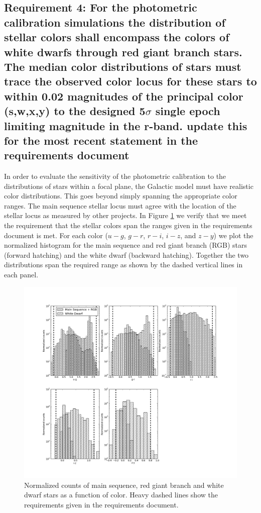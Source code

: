 \documentclass[]{article}
\begin{document}
{\subsection{Requirement 4: For the photometric calibration simulations
the distribution of stellar colors shall encompass the colors of white dwarfs through red giant branch stars.
The median color distributions of stars must trace the observed color locus for these stars to within 0.02 magnitudes
of the principal color (s,w,x,y) to the designed 5$\sigma$ single epoch limiting magnitude in the r-band.
{\bf update this for the most recent statement in the requirements document}}
In order to evaluate the sensitivity of the photometric calibration to the distributions of stars within a focal plane, the Galactic model
must have realistic color distributions.
This goes beyond simply spanning the appropriate color ranges.  The main sequence stellar locus must agree with the location of the
stellar locus as measured by other projects.  In Figure \ref{fig:starcolorspan} we verify that we meet the requirement that the stellar
colors span the ranges given in the requirements document is met.  For each color ($u-g$, $g-r$, $r-i$, $i-z$, and $z-y$) we plot the normalized histogram
for the main sequence and red giant branch (RGB) stars (forward hatching) and the white dwarf (backward hatching).  Together the two distributions span the required
range as shown by the dashed vertical lines in each panel.  
\begin{figure}[H]
\centering
\includegraphics[width=5in]{validation_figures/star_lsst_color_hist.png}
\caption{Normalized counts of main sequence, red giant branch and white dwarf stars as a function of color.  Heavy dashed lines show the requirements given in the requirements document.\label{fig:starcolorspan}}
\end{figure}

}
\end{document}
